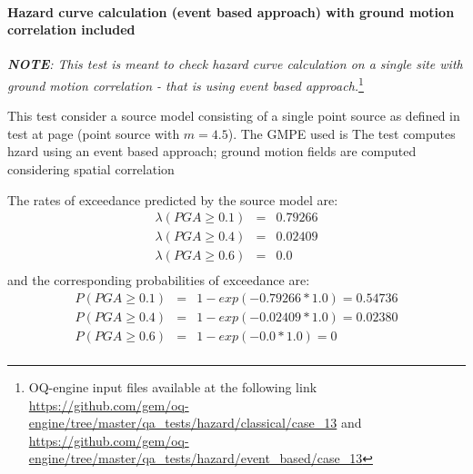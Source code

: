 \paragraph{Hazard curve calculation (event based approach) with ground
motion correlation included} 
%
\textit{\textbf{NOTE}: This test is meant to check hazard curve calculation on a
single site with ground motion correlation - that is using event based
approach.}\footnote{
OQ-engine input files available at the following link
\url{https://github.com/gem/oq-engine/tree/master/qa_tests/hazard/classical/case_13} 
and 
\url{https://github.com/gem/oq-engine/tree/master/qa_tests/hazard/event_based/case_13} 
}

This test consider a source model consisting of a single point source as 
defined in test at page \pageref{sec:test12} (point source with $m = 4.5$).
The GMPE used is \textcite{boore2008}
%
The test computes hzard using an event based approach; ground motion fields
are computed considering spatial correlation \parencite{jayaram2009}

The rates of exceedance predicted by the source model are:
\begin{eqnarray}
\lambda(PGA \geq 0.1) & = &  0.79266 \nonumber \\
\lambda(PGA \geq 0.4) & = &  0.02409 \nonumber \\
\lambda(PGA \geq 0.6) & = & 0.0 \nonumber \\
\end{eqnarray}
and the corresponding probabilities of exceedance are:
\begin{eqnarray}
P(PGA \geq 0.1) & = & 1 - exp(- 0.79266 * 1.0) = 0.54736\nonumber \\
P(PGA \geq 0.4) & = & 1 - exp(- 0.02409 * 1.0) =  0.02380\nonumber \\
P(PGA \geq 0.6) & = & 1 - exp(- 0.0 * 1.0) = 0 \nonumber \\
\end{eqnarray}





